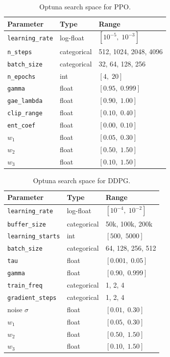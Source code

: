 \documentclass[journal,10pt,twocolumn]{IEEEtran}
\begin{document}
\begin{table}[h]
  \centering
  \caption{Optuna search space for PPO.}
  \label{tab:ppo_space}
  \begin{tabular}{lll}
    \toprule
    Parameter & Type & Range \\
    \midrule
    \texttt{learning\_rate} & log-float & $[10^{-5},\;10^{-3}]$ \\
    \texttt{n\_steps}       & categorical & 512, 1024, 2048, 4096 \\
    \texttt{batch\_size}    & categorical & 32, 64, 128, 256 \\
    \texttt{n\_epochs}      & int & $[4,\;20]$ \\
    \texttt{gamma}          & float & $[0.95,\;0.999]$ \\
    \texttt{gae\_lambda}    & float & $[0.90,\;1.00]$ \\
    \texttt{clip\_range}    & float & $[0.10,\;0.40]$ \\
    \texttt{ent\_coef}      & float & $[0.00,\;0.10]$ \\
    $w_1$                   & float & $[0.05,\;0.30]$ \\
    $w_2$                   & float & $[0.50,\;1.50]$ \\
    $w_3$                   & float & $[0.10,\;1.50]$ \\
    \bottomrule
  \end{tabular}
\end{table}

\begin{table}[h]
  \centering
  \caption{Optuna search space for DDPG.}
  \label{tab:ddpg_space}
  \begin{tabular}{lll}
    \toprule
    Parameter & Type & Range \\
    \midrule
    \texttt{learning\_rate}   & log-float & $[10^{-4},\;10^{-2}]$ \\
    \texttt{buffer\_size}     & categorical & 50k, 100k, 200k \\
    \texttt{learning\_starts} & int & $[500,\;5000]$ \\
    \texttt{batch\_size}      & categorical & 64, 128, 256, 512 \\
    \texttt{tau}              & float & $[0.001,\;0.05]$ \\
    \texttt{gamma}            & float & $[0.90,\;0.999]$ \\
    \texttt{train\_freq}      & categorical & 1, 2, 4 \\
    \texttt{gradient\_steps}  & categorical & 1, 2, 4 \\
    noise $\sigma$            & float & $[0.01,\;0.30]$ \\
    $w_1$                     & float & $[0.05,\;0.30]$ \\
    $w_2$                     & float & $[0.50,\;1.50]$ \\
    $w_3$                     & float & $[0.10,\;1.50]$ \\
    \bottomrule
  \end{tabular}
\end{table}
\end{document}
